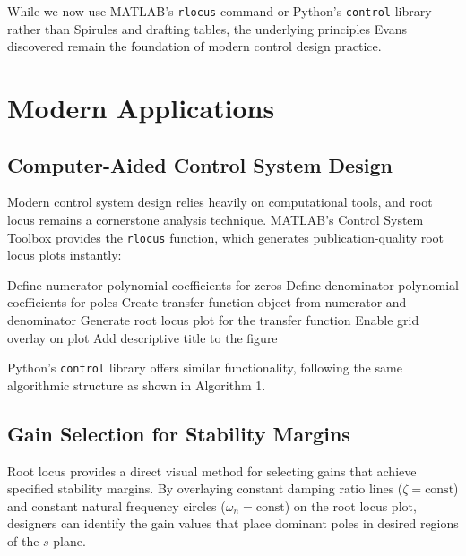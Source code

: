 While we now use MATLAB's \texttt{rlocus} command or Python's \texttt{control} library rather than Spirules and drafting tables, the underlying principles Evans discovered remain the foundation of modern control design practice.

\section{Modern Applications}
\label{sec:modern_applications}

\subsection{Computer-Aided Control System Design}

Modern control system design relies heavily on computational tools, and root locus remains a cornerstone analysis technique. MATLAB's Control System Toolbox provides the \texttt{rlocus} function, which generates publication-quality root locus plots instantly:

\begin{algorithm}
\caption{Root Locus Generation}
\begin{algorithmic}[1]
\State Define numerator polynomial coefficients for zeros
\State Define denominator polynomial coefficients for poles
\State Create transfer function object from numerator and denominator
\State Generate root locus plot for the transfer function
\State Enable grid overlay on plot
\State Add descriptive title to the figure
\end{algorithmic}
\end{algorithm}

Python's \texttt{control} library offers similar functionality, following the same algorithmic structure as shown in Algorithm 1.

\subsection{Gain Selection for Stability Margins}

Root locus provides a direct visual method for selecting gains that achieve specified stability margins. By overlaying constant damping ratio lines ($\zeta = \text{const}$) and constant natural frequency circles ($\omega_n = \text{const}$) on the root locus plot, designers can identify the gain values that place dominant poles in desired regions of the $s$-plane.

